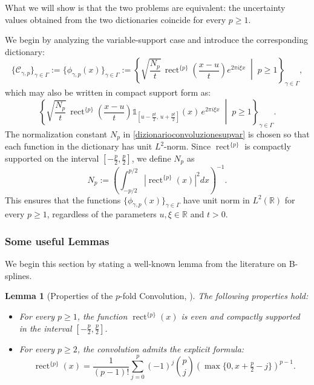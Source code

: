 \documentclass[preprint,hidelinks,authoryear]{elsarticle}
\newtheorem{Lemma}[Thm]{Lemma}
\theoremstyle{plain}
\theoremstyle{definition}
\theoremstyle{remark}
\begin{document}
What we will show is that the two problems are equivalent: the uncertainty values obtained from the two dictionaries coincide for every $ p \ge 1 $.

We begin by analyzing the variable-support case and introduce the corresponding dictionary:
\begin{equation}
\{\mathcal{C}_{\gamma,p}\}_{\gamma \in \Gamma} := \{\phi_{\gamma,p}(x)\}_{\gamma \in \Gamma} := \left\{ \sqrt{\frac{N_p}{t}} \, \operatorname{rect}^{\{p\}}\left( \frac{x - u}{t} \right) e^{2\pi i \xi x} \;\middle|\; p \ge 1 \right\}_{\gamma \in \Gamma},
\label{dizionarioconvoluzionesupvar}
\end{equation}
which may also be written in compact support form as:
$$
\left\{ \sqrt{\frac{N_p}{t}} \, \operatorname{rect}^{\{p\}}\left( \frac{x - u}{t} \right) \mathds{1}_{[u - \frac{pt}{2}, \, u + \frac{pt}{2}]}(x) \, e^{2\pi i \xi x} \;\middle|\; p \ge 1 \right\}_{\gamma \in \Gamma}.
$$
The normalization constant $ N_p $ in \eqref{dizionarioconvoluzionesupvar} is chosen so that each function in the dictionary has unit $ L^2 $-norm. Since $ \operatorname{rect}^{\{p\}} $ is compactly supported on the interval $ \left[-\frac{p}{2}, \frac{p}{2}\right] $, we define $ N_p $ as  
$$
N_p := \left( \int_{-p/2}^{p/2} \left| \operatorname{rect}^{\{p\}}(x) \right|^2 dx \right)^{-1}.
$$  
This ensures that the functions $ \{\phi_{\gamma,p}(x)\}_{\gamma \in \Gamma}$ have unit norm in $ L^2(\mathbb{R}) $ for every $ p \ge 1 $, regardless of the parameters $ u,\xi \in \mathbb{R} $ and $ t > 0 $.




\subsubsection{Some useful Lemmas}
We begin this section by stating a well-known lemma from the literature on B-splines.
\begin{Lemma}[Properties of the $ p $-fold Convolution, \cite{schoenberg1946contributions,schoenberg1969cardinal,de2018stability}]
\label{lemma:schoenberg}
The following properties hold:
\begin{itemize}
    \item[(i)] For every $ p \ge 1 $, the function $ \operatorname{rect}^{\{p\}}(x) $ is even and compactly supported in the interval $ [-\frac{p}{2}, \frac{p}{2}] $.
    
    \item[(ii)] For every $ p \ge 2 $, the convolution admits the explicit formula:
    \begin{equation}
        \operatorname{rect}^{\{p\}}(x) = \frac{1}{(p-1)!} \sum_{j=0}^{p} (-1)^j \binom{p}{j} \left( \max\{0, x + \tfrac{p}{2} - j \} \right)^{p-1}.
        \label{formulaconvoluzione}
    \end{equation}
\end{itemize}
\end{Lemma}
\end{document}
